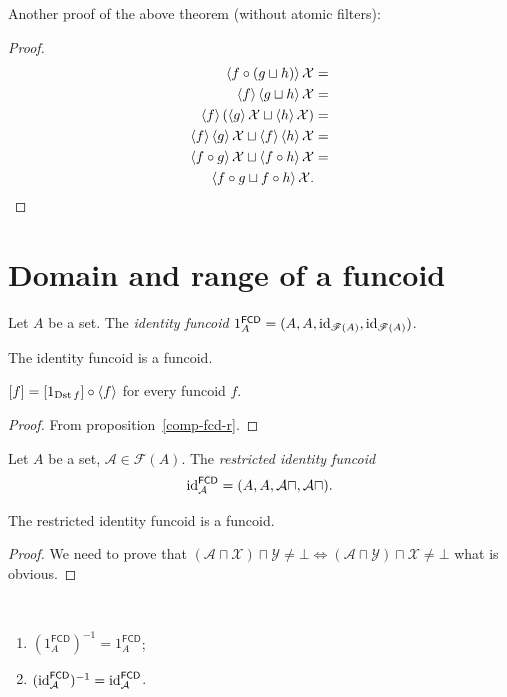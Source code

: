 Another proof of the above theorem (without atomic filters):
\begin{proof}
~
\begin{align*}
\left\langle f\circ(g\sqcup h)\right\rangle\mathcal{X} & =\\
\left\langle f\right\rangle\left\langle g\sqcup h\right\rangle\mathcal{X} & =\\
\left\langle f\right\rangle(\left\langle g\right\rangle\mathcal{X}\sqcup\left\langle h\right\rangle\mathcal{X}) & =\\
\left\langle f\right\rangle\left\langle g\right\rangle\mathcal{X}\sqcup\left\langle f\right\rangle\left\langle h\right\rangle\mathcal{X} & =\\
\left\langle f\circ g\right\rangle\mathcal{X}\sqcup\left\langle f\circ h\right\rangle\mathcal{X} & =\\
\left\langle f\circ g\sqcup f\circ h\right\rangle\mathcal{X}.
\end{align*}

\end{proof}

\section{Domain and range of a funcoid}
\begin{defn}
Let $A$ be a set. The \emph{identity funcoid}
$1_{A}^{\mathsf{FCD}}=(A,A,{\operatorname{id}}_{\mathscr{F}(A)},{\operatorname{id}}_{\mathscr{F}(A)})$.
\end{defn}
\begin{obvious}
The identity funcoid is a funcoid.\end{obvious}
\begin{prop}
$\mathord{\mathrel{\left[f\right]}}=\mathord{\mathrel{\left[1_{\operatorname{Dst} f}\right]}}\circ\left\langle f\right\rangle$
for every funcoid $f$.\end{prop}
\begin{proof}
From proposition~\ref{comp-fcd-r}.\end{proof}
\begin{defn}
Let $A$ be a set,
$\mathcal{A}\in\mathscr{F}(A)$.
The \emph{restricted identity funcoid
\[
{\operatorname{id}}_{\mathcal{A}}^{\mathsf{FCD}}=(A,A,\mathcal{A}\sqcap,\mathcal{A}\sqcap).
\]
}\end{defn}
\begin{prop}
The restricted identity funcoid is a funcoid.\end{prop}
\begin{proof}
We need to prove that
$(\mathcal{A}\sqcap\mathcal{X})\sqcap\mathcal{Y}\ne\bot
\Leftrightarrow(\mathcal{A}\sqcap\mathcal{Y})\sqcap\mathcal{X}\ne\bot$
what is obvious.\end{proof}
\begin{obvious}
~
\begin{enumerate}
\item $(1_{A}^{\mathsf{FCD}})^{-1}=1_{A}^{\mathsf{FCD}}$;
\item
$({\operatorname{id}}_{\mathcal{A}}^{\mathsf{FCD}})^{-1}={\operatorname{id}}_{\mathcal{A}}^{\mathsf{FCD}}$.
\end{enumerate}
\end{obvious}

